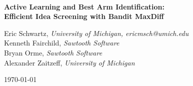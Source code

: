 \documentclass[blindrev]{informs3} %
\newcommand{\titleofthispaper}{
	\textbf{Active Learning and Best Arm Identification: \\
	Efficient Idea Screening with Bandit MaxDiff} 
}
\begin{document}

\begin{center}

	~ \\

	\vspace{2in}

	\titleofthispaper

	\vspace{1in}

	{Eric Schwartz,}
	\emph{University of Michigan, {ericmsch@umich.edu} } \\
	{Kenneth Fairchild,} 
	\emph{Sawtooth Software} \\
	{Bryan Orme,}
	\emph{Sawtooth Software} \\
	{Alexander Zaitzeff,}
	\emph{University of Michigan} 

	\vspace{1in}

	\today
 \end{center}

 \newpage






\end{document}
